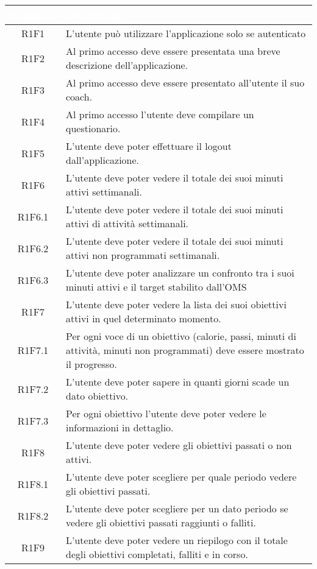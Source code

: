 \setlength\arrayrulewidth{1pt}
\renewcommand{\arraystretch}{1.5}
\begin{longtable}{| c | C{10cm}|}
\label{tab:requisiti-funzionali-cliente}

\textcolor{white}{\textbf{Requisito}} & \textcolor{white}{\textbf{Descrizione}}\\\hline
\endhead
R1F1 & L'utente può utilizzare l'applicazione solo se autenticato\\\hline
R1F2 & Al primo accesso deve essere presentata una breve descrizione dell'applicazione.\\\hline
R1F3 & Al primo accesso deve essere presentato all'utente il suo coach.\\\hline
R1F4 & Al primo accesso l'utente deve compilare un questionario.\\\hline
R1F5 & L'utente deve poter effettuare il logout dall'applicazione.\\\hline
R1F6 & L'utente deve poter vedere il totale dei suoi minuti attivi settimanali.\\\hline
R1F6.1 & L'utente deve poter vedere il totale dei suoi minuti attivi di attività settimanali.\\\hline
R1F6.2 & L'utente deve poter vedere il totale dei suoi minuti attivi non programmati settimanali.\\\hline
R1F6.3 & L’utente deve poter analizzare un confronto tra i suoi minuti attivi e il target stabilito dall’OMS \\\hline
R1F7 & L’utente deve poter vedere la lista dei suoi obiettivi attivi in quel determinato momento. \\\hline
R1F7.1 & Per ogni voce di un obiettivo (calorie, passi, minuti di attività, minuti non programmati) deve essere mostrato il progresso.\\\hline
R1F7.2 & L’utente deve poter sapere in quanti giorni scade un dato obiettivo. \\\hline
R1F7.3 & Per ogni obiettivo l’utente deve poter vedere le informazioni in dettaglio.\\\hline
R1F8 & L’utente deve poter vedere gli obiettivi passati o non attivi. \\\hline
R1F8.1 & L’utente deve poter scegliere per quale periodo vedere gli obiettivi passati. \\\hline
R1F8.2 & L’utente deve poter scegliere per un dato periodo se vedere gli obiettivi passati raggiunti o falliti. \\\hline
R1F9 & L’utente deve poter vedere un riepilogo con il totale degli obiettivi completati, falliti e in corso. \\\hline

\end{longtable}
